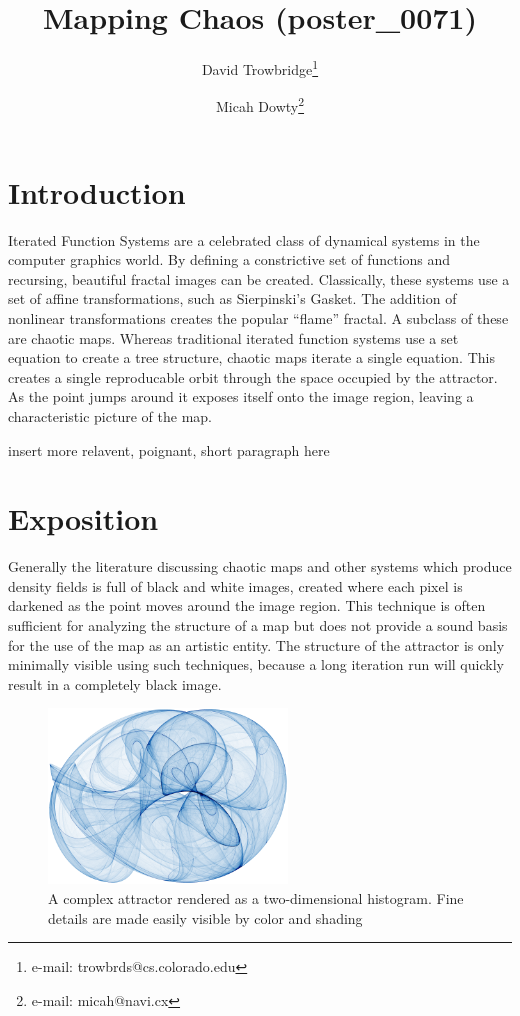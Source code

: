 \documentclass{acmsiggraph}
\title{Mapping Chaos (poster\_0071)}
\author{
  David Trowbridge\thanks{e-mail: trowbrds@cs.colorado.edu}
\and
  Micah Dowty\thanks{e-mail: micah@navi.cx}
}
\begin{document}
\maketitle

\section{Introduction}
\copyrightspace
Iterated Function Systems are a celebrated class of dynamical systems in the
computer graphics world. By defining a constrictive set of functions and
recursing, beautiful fractal images can be created. Classically, these
systems use a set of affine transformations, such as Sierpinski's Gasket.
The addition of nonlinear transformations creates the popular ``flame''
fractal. A subclass of these are chaotic maps. Whereas traditional iterated
function systems use a set equation to create a tree structure, chaotic maps
iterate a single equation. This creates a single reproducable orbit through
the space occupied by the attractor. As the point jumps around it exposes
itself onto the image region, leaving a characteristic picture of the map.

insert more relavent, poignant, short paragraph here

\section{Exposition}
Generally the literature discussing chaotic maps and other systems which
produce density fields is full of black and white images, created where
each pixel is darkened as the point moves around the image region. This
technique is often sufficient for analyzing the structure of a map but
does not provide a sound basis for the use of the map as an artistic
entity. The structure of the attractor is only minimally visible using
such techniques, because a long iteration run will quickly result in a
completely black image.

\begin{figure}[ht]
\centering
\includegraphics[width=2.5in]{1.png}
\caption{A complex attractor rendered as a two-dimensional histogram.
Fine details are made easily visible by color and shading}
\end{figure}
\end{document}
